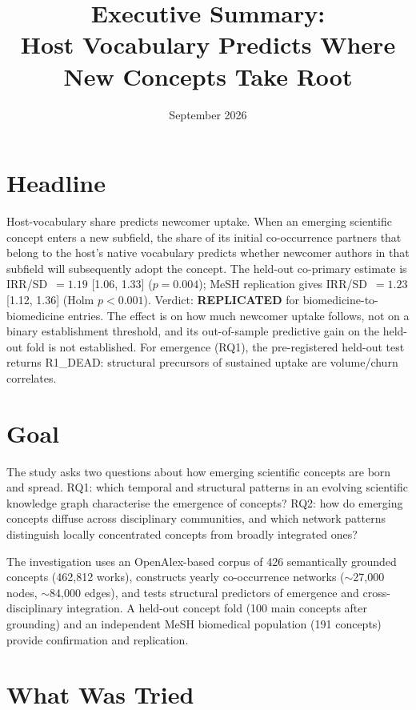 \documentclass[11pt,letterpaper]{article}
\title{Executive Summary:\\[4pt]
Host Vocabulary Predicts Where New Concepts Take Root}
\author{}
\date{September 2026}
\begin{document}
\maketitle

\section*{Headline}

Host-vocabulary share predicts newcomer uptake. When an emerging scientific concept enters a new subfield, the share of its initial co-occurrence partners that belong to the host's native vocabulary predicts whether newcomer authors in that subfield will subsequently adopt the concept. The held-out co-primary estimate is IRR/SD~$= 1.19$ [1.06, 1.33] ($p = 0.004$); MeSH replication gives IRR/SD~$= 1.23$ [1.12, 1.36] (Holm $p < 0.001$). Verdict: \textbf{REPLICATED} for biomedicine-to-biomedicine entries. The effect is on how much newcomer uptake follows, not on a binary establishment threshold, and its out-of-sample predictive gain on the held-out fold is not established. For emergence (RQ1), the pre-registered held-out test returns R1\_DEAD: structural precursors of sustained uptake are volume/churn correlates.

\section*{Goal}

The study asks two questions about how emerging scientific concepts are born and spread. RQ1: which temporal and structural patterns in an evolving scientific knowledge graph characterise the emergence of concepts? RQ2: how do emerging concepts diffuse across disciplinary communities, and which network patterns distinguish locally concentrated concepts from broadly integrated ones?

The investigation uses an OpenAlex-based corpus of 426 semantically grounded concepts (462,812 works), constructs yearly co-occurrence networks (${\sim}$27,000 nodes, ${\sim}$84,000 edges), and tests structural predictors of emergence and cross-disciplinary integration. A held-out concept fold (100 main concepts after grounding) and an independent MeSH biomedical population (191 concepts) provide confirmation and replication.

\section*{What Was Tried}
\end{document}
